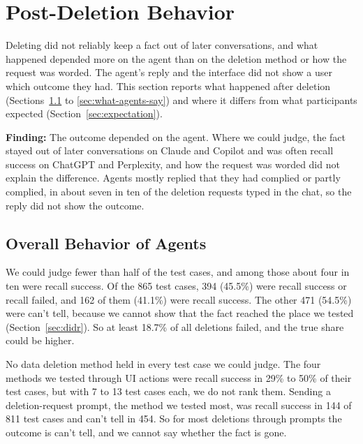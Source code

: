 \section{Post-Deletion Behavior}
    \label{sec:tech_results}

    Deleting did not reliably keep a fact out of later conversations, and what happened depended more on the agent than on the deletion method or how the request was worded. The agent's reply and the interface did not show a user which outcome they had. This section reports what happened after deletion (Sections~\ref{sec:overall} to \ref{sec:what-agents-say}) and where it differs from what participants expected (Section~\ref{sec:expectation}).

    \begin{takeawaybox}
    \textbf{Finding:} The outcome depended on the agent. Where we could judge, the fact stayed out of later conversations on Claude and Copilot and was often recall success on ChatGPT and Perplexity, and how the request was worded did not explain the difference. Agents mostly replied that they had complied or partly complied, in about seven in ten of the deletion requests typed in the chat, so the reply did not show the outcome.
    \end{takeawaybox}
    
    \subsection{Overall Behavior of Agents}
    \label{sec:overall}

    We could judge fewer than half of the test cases, and among those about four in ten were recall success. Of the 865 test cases, 394 (45.5\%) were recall success or recall failed, and 162 of them (41.1\%) were recall success. The other 471 (54.5\%) were can't tell, because we cannot show that the fact reached the place we tested (Section~\ref{sec:didr}). So at least 18.7\% of all deletions failed, and the true share could be higher.

    No data deletion method held in every test case we could judge. The four methods we tested through UI actions were recall success in 29\% to 50\% of their test cases, but with 7 to 13 test cases each, we do not rank them. Sending a deletion-request prompt, the method we tested most, was recall success in 144 of 811 test cases and can't tell in 454. So for most deletions through prompts the outcome is can't tell, and we cannot say whether the fact is gone.


